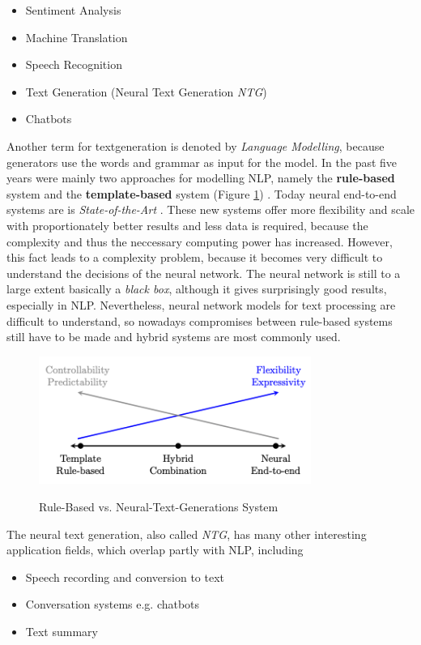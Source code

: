 \begin{itemize}
\item Sentiment Analysis
\item Machine Translation
\item Speech Recognition
\item Text Generation (Neural Text Generation \textit{NTG})
\item Chatbots
\end{itemize}

Another term for textgeneration is denoted by \textit{Language Modelling}, because generators use the words and grammar as input for the model. In the past five years were mainly two approaches for modelling NLP, namely the \textbf{rule-based} system and the \textbf{template-based} system (Figure \ref{rules_based}) \cite{NTG2}. Today neural end-to-end systems are is \textit{State-of-the-Art} \cite{End_to_End}. These new systems offer more flexibility and scale with proportionately better results and less data is required, because the complexity and thus the neccessary computing power has increased. However, this fact leads to a complexity problem, because it becomes very difficult to understand the decisions of the neural network. The neural network is still to a large extent basically a \textit{black box}, although it gives surprisingly good results, especially in NLP. Nevertheless, neural network models for text processing are difficult to understand, so nowadays compromises between rule-based systems still have to be made and hybrid systems are most commonly used. 

\begin{figure}
  \begin{center}
  \includegraphics[width=3.5in]{photos/rule_based}\\
  \caption{Rule-Based vs. Neural-Text-Generations System \cite{NTG2}}\label{rules_based}
  \end{center}
\end{figure}

The neural text generation, also called \textit{NTG}, has many other interesting application fields, which overlap partly with NLP, including
\begin{itemize}
\item Speech recording and conversion to text
\item Conversation systems e.g. chatbots
\item Text summary
\end{itemize} 

